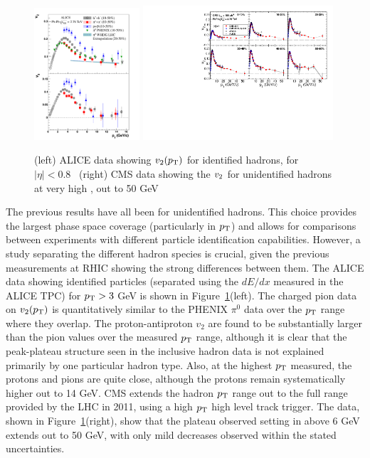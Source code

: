 \begin{figure}[!tb]
\begin{center}
\includegraphics[width=0.35\textwidth]{flowcorrelations_figs/alice_fig5_vn_pid.pdf}
\includegraphics[width=0.63\textwidth]{flowcorrelations_figs/v2_pt_ep_atlas_alice_eta0-1_band_v5.pdf}
\caption[]{(left) ALICE data showing $\mbox{$v_2$}(\mbox{$p_{\mathrm{T}}$})$ for identified
  hadrons, for $|\eta|<0.8$~\cite{Abelev:2012di} (right) CMS data
  showing the $\mbox{$v_2$}$ for unidentified hadrons at very high \pT, out
  to 50 GeV~\cite{Chatrchyan:2012xq}}
\label{fig:pas:fc:highpt}
\end{center}
\end{figure}
The previous results have all been for unidentified hadrons.  This choice provides the largest phase
space coverage (particularly in $\mbox{$p_{\mathrm{T}}$}$) and allows for comparisons between experiments with different particle
identification capabilities.  However, a study separating the different hadron species is crucial,
given the previous measurements at RHIC showing the strong differences between them.
The ALICE data showing identified particles (separated using the $dE/dx$ measured in the ALICE TPC) for $\mbox{$p_{\mathrm{T}}$}>3$ GeV
is shown in Figure~\ref{fig:pas:fc:highpt}(left).  The charged pion data on $v_2(\mbox{$p_{\mathrm{T}}$})$ is quantitatively similar to
the PHENIX $\pi^0$ data over the $\mbox{$p_{\mathrm{T}}$}$ range where they overlap.  The proton-antiproton $v_2$ are found to be
substantially larger than the pion values over the measured $\mbox{$p_{\mathrm{T}}$}$ range, although it is clear that the peak-plateau
structure seen in the inclusive hadron data is not explained primarily by one particular hadron type.
Also, at the highest $\mbox{$p_{\mathrm{T}}$}$ measured, the protons and pions are quite close, although the protons remain
systematically higher out to 14 GeV.
CMS extends the hadron $\mbox{$p_{\mathrm{T}}$}$ range out to the full range provided by the LHC in 2011, using a high $\mbox{$p_{\mathrm{T}}$}$
high level track trigger.  The data, shown in Figure~\ref{fig:pas:fc:highpt}(right), show that the
plateau observed setting in above 6 GeV extends out to 50 GeV, with only mild decreases observed within
the stated uncertainties.

